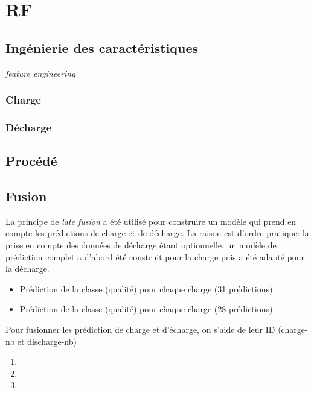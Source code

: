 \chapter{\ac{RF}}
\section{Ingénierie des caractéristiques}
\textit{feature engineering}
\subsection{Charge}
\subsection{Décharge}
\section{Procédé}
\section{Fusion}
La principe de \emph{late fusion} a été utilisé pour construire un modèle qui prend en compte les prédictions de charge et de décharge. La raison est d'ordre pratique: la prise en compte des données de décharge étant optionnelle, un modèle de prédiction complet a d'abord été construit pour la charge puis a été adapté pour la décharge.

\begin{itemize}
    \item Prédiction de la classe (qualité) pour chaque charge (31 prédictions).
    \item Prédiction de la classe (qualité) pour chaque charge (28 prédictions).
\end{itemize}

Pour fusionner les prédiction de charge et d'écharge, on s'aide de leur ID (charge-nb et discharge-nb)

\begin{enumerate}
	\item 
	\item 
	\item 
\end{enumerate}

